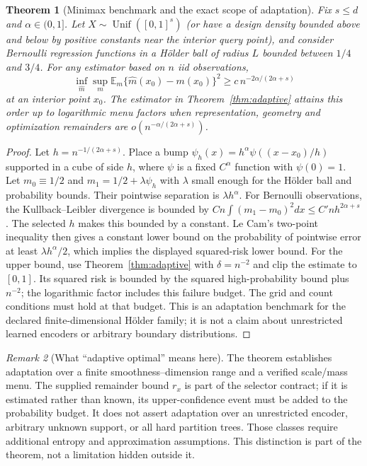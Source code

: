 \documentclass[11pt,a4paper]{article}
\newcommand{\E}{\mathbb E}\newcommand{\Pp}{\mathbb P}
\numberwithin{equation}{section}
\newtheorem{theorem}{Theorem}[section]
\theoremstyle{definition}\newtheorem{definition}[theorem]{Definition}
\theoremstyle{remark}\newtheorem{remark}[theorem]{Remark}
\begin{document}
\begin{theorem}[Minimax benchmark and the exact scope of adaptation]\label{thm:minimax}
Fix $s\le d$ and $\alpha\in(0,1]$. Let $X\sim\operatorname{Unif}([0,1]^s)$ (or have a design density bounded above and below by positive constants near the interior query point), and consider Bernoulli regression functions in a Hölder ball of radius $L$ bounded between $1/4$ and $3/4$. For any estimator based on $n$ iid observations,
\[
 \inf_{\widehat m}\sup_{m}\E_m\{\widehat m(x_0)-m(x_0)\}^2
 \ge c\,n^{-2\alpha/(2\alpha+s)}
\]
at an interior point $x_0$. The estimator in Theorem~\ref{thm:adaptive} attains this order up to logarithmic menu factors when representation, geometry and optimization remainders are $o(n^{-\alpha/(2\alpha+s)})$.
\end{theorem}
\begin{proof}
Let $h=n^{-1/(2\alpha+s)}$. Place a bump
$\psi_h(x)=h^\alpha\psi((x-x_0)/h)$ supported in a cube of side $h$, where $\psi$ is a fixed $C^\alpha$ function with $\psi(0)=1$. Let $m_0\equiv1/2$ and $m_1=1/2+\lambda\psi_h$ with $\lambda$ small enough for the Hölder ball and probability bounds. Their pointwise separation is $\lambda h^\alpha$. For Bernoulli observations, the Kullback--Leibler divergence is bounded by
$C n\int(m_1-m_0)^2dx\le C'n h^{2\alpha+s}$. The selected $h$ makes this bounded by a constant. Le Cam's two-point inequality then gives a constant lower bound on the probability of pointwise error at least $\lambda h^\alpha/2$, which implies the displayed squared-risk lower bound. For the upper bound, use Theorem~\ref{thm:adaptive} with $\delta=n^{-2}$ and clip the estimate to $[0,1]$. Its squared risk is bounded by the squared high-probability bound plus $n^{-2}$; the logarithmic factor includes this failure budget. The grid and count conditions must hold at that budget. This is an adaptation benchmark for the declared finite-dimensional Hölder family; it is not a claim about unrestricted learned encoders or arbitrary boundary distributions.
\end{proof}

\begin{remark}[What “adaptive optimal” means here]
The theorem establishes adaptation over a finite smoothness--dimension range and a verified scale/mass menu. The supplied remainder bound $r_x$ is part of the selector contract; if it is estimated rather than known, its upper-confidence event must be added to the probability budget. It does not assert adaptation over an unrestricted encoder, arbitrary unknown support, or all hard partition trees. Those classes require additional entropy and approximation assumptions. This distinction is part of the theorem, not a limitation hidden outside it.
\end{remark}
\end{document}
